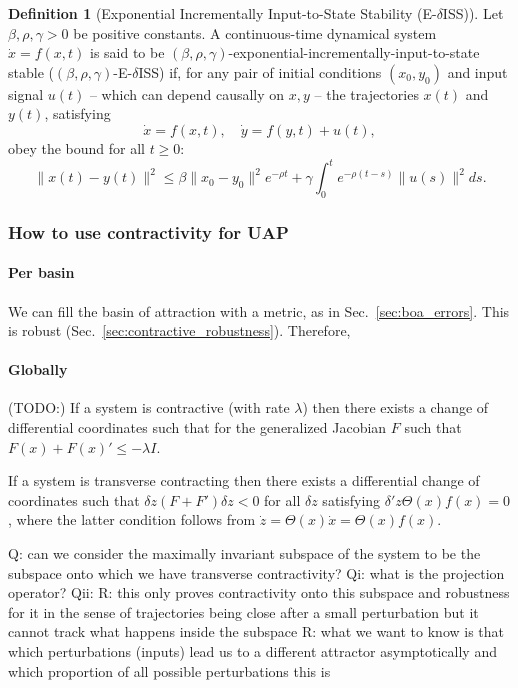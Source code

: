 \documentclass{article}
\newcommand{\ascomment}[1]{\textcolor{ascolor}{(#1)}}
\theoremstyle{definition} \newtheorem{definition}{Definition}
\theoremstyle{remark} \newtheorem{remark}{Remark}
\newcounter{ct}
\begin{document}
\begin{definition}[Exponential Incrementally Input-to-State Stability (E-$\delta$ISS)]
Let \( \beta, \rho, \gamma > 0 \) be positive constants.
A continuous-time dynamical system  
\(\dot{x} = f(x, t)\)
is said to be \((\beta, \rho, \gamma)\)-exponential-incrementally-input-to-state stable (\((\beta, \rho, \gamma)\)-E-$\delta$ISS) if, for any pair of initial conditions \( (x_0, y_0) \) and input signal \( u(t) \) – which can depend causally on \( x, y \) – the trajectories \( x(t) \) and \( y(t) \), satisfying  
\[
\dot{x} = f(x, t), \quad \dot{y} = f(y, t) + u(t),
\]
obey the bound for all \( t \geq 0 \):
\[
\| x(t) - y(t) \|^2 \leq  \beta \| x_0 - y_0 \|^2 e^{- \rho t} + \gamma \int_0^t e^{-\rho (t-s)} \| u(s) \|^2 ds.
\]
\end{definition}


\subsubsection{How to use contractivity for UAP}
\paragraph{Per basin}
We can fill the basin of attraction with a metric, as in Sec.~\ref{sec:boa_errors}.
This is robust (Sec.~\ref{sec:contractive_robustness}).
Therefore, 


\paragraph{Globally}
\ascomment{TODO:}
If a system is contractive (with rate $\lambda$) then there exists a change of differential coordinates %
such that for the generalized Jacobian $F$ such that $F(x)+F (x)' \leq  -\lambda I$.

If a system is transverse contracting then there exists a differential change of coordinates such that $\delta z(F + F')\delta z < 0$ for all $\delta z$ satisfying $\delta' z \Theta(x)f (x) = 0$, where the latter condition follows from  $\dot z= \Theta(x) \dot x = \Theta(x)f (x)$.

Q: can we consider the maximally invariant subspace of the system to be the subspace onto which we have transverse contractivity?
Qi: what is the projection operator?
Qii: 
R: this only proves contractivity onto this subspace and robustness for it in the sense of trajectories being close after a small perturbation but it cannot track what happens inside the subspace
R: what we want to know is that which perturbations (inputs) lead us to a different attractor asymptotically and which proportion of all possible perturbations this is 
\end{document}
